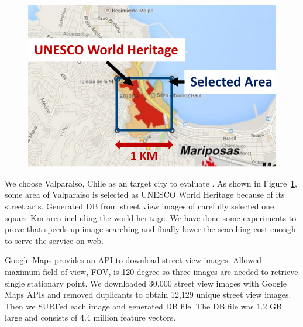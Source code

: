

\begin{figure}[t]
	\centering
	\includegraphics[scale=0.64]{figs/crawled_area}
	\vspace{-0.1in}
	\vspace{-0.1in}
	\label{fig:crawled_area}
\end{figure}

We choose Valparaiso, Chile as an target city to evaluate \name{}.
As shown in Figure~\ref{fig:crawled_area}, some area of Valparaiso is selected as UNESCO World Heritage because of its street arts.
Generated DB from street view images of carefully selected one square Km area including the world heritage.
We have done some experiments to prove that \name{} speeds up image searching and finally lower the searching cost enough to serve the service on web.

Google Maps provides an API to download street view images.
Allowed maximum field of view, FOV, is 120 degree so three images are needed to retrieve single stationary point.
We downloaded 30,000 street view images with Google Maps APIs and removed duplicants to obtain 12,129 unique street view images.
Then we SURFed each image and generated DB file.
The DB file was 1.2 GB large and consists of 4.4 million feature vectors.

